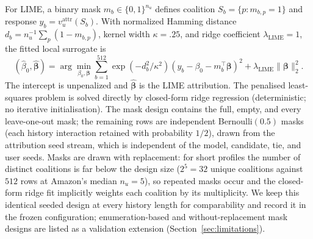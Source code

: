 \documentclass[manuscript,screen,review,anonymous]{acmart}
\begin{document}
For LIME, a binary mask $m_b\in\{0,1\}^{n_u}$ defines coalition $S_b=\{p:m_{b,p}=1\}$ and response $y_b=v_u^{\mathrm{attr}}(S_b)$. With normalized Hamming distance $d_b=n_u^{-1}\sum_p(1-m_{b,p})$, kernel width $\kappa=.25$, and ridge coefficient $\lambda_{\mathrm{LIME}}=1$, the fitted local surrogate is
\begin{equation}
(\hat\beta_0,\hat{\boldsymbol\beta})=\arg\min_{\beta_0,\boldsymbol\beta}
\sum_{b=1}^{512}\exp\left(-d_b^2/\kappa^2\right)\left(y_b-\beta_0-m_b^{\top}\boldsymbol\beta\right)^2
+\lambda_{\mathrm{LIME}}\lVert\boldsymbol\beta\rVert_2^2.
\label{eq:lime}
\end{equation}
The intercept is unpenalized and $\hat{\boldsymbol\beta}$ is the LIME attribution. The penalised least-squares problem is solved directly by closed-form ridge regression (deterministic; no iterative initialisation). The mask design contains the full, empty, and every leave-one-out mask; the remaining rows are independent Bernoulli$(0.5)$ masks (each history interaction retained with probability $1/2$), drawn from the attribution seed stream, which is independent of the model, candidate, tie, and user seeds. Masks are drawn with replacement: for short profiles the number of distinct coalitions is far below the design size ($2^5=32$ unique coalitions against $512$ rows at Amazon's median $n_u=5$), so repeated masks occur and the closed-form ridge fit implicitly weights each coalition by its multiplicity. We keep this identical seeded design at every history length for comparability and record it in the frozen configuration; enumeration-based and without-replacement mask designs are listed as a validation extension (Section~\ref{sec:limitations}).
\end{document}
